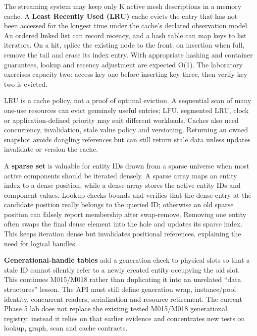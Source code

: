 \hypertarget{05-engine-i-ch008-an-lru-cache-and-a-sparse-set-reconnect-algorithms-to-engine-ownership}{}

The streaming system may keep only K active mesh descriptions in a memory cache. A \textbf{Least Recently Used (LRU)} cache evicts the entry that has not been accessed for the longest time under the cache's declared observation model. An ordered linked list can record recency, and a hash table can map keys to list iterators. On a hit, splice the existing node to the front; on insertion when full, remove the tail and erase its index entry. With appropriate hashing and container guarantees, lookup and recency adjustment are expected O(1). The laboratory exercises capacity two: access key one before inserting key three, then verify key two is evicted.

LRU is a cache policy, not a proof of optimal eviction. A sequential scan of many one-use resources can evict genuinely useful entries; LFU, segmented LRU, clock or application-defined priority may suit different workloads. Caches also need concurrency, invalidation, stale value policy and versioning. Returning an owned snapshot avoids dangling references but can still return stale data unless updates invalidate or version the cache.

A \textbf{sparse set} is valuable for entity IDs drawn from a sparse universe when most active components should be iterated densely. A sparse array maps an entity index to a dense position, while a dense array stores the active entity IDs and component values. Lookup checks bounds and verifies that the dense entry at the candidate position really belongs to the queried ID; otherwise an old sparse position can falsely report membership after swap-remove. Removing one entity often swaps the final dense element into the hole and updates its sparse index. This keeps iteration dense but invalidates positional references, explaining the need for logical handles.

\textbf{Generational-handle tables} add a generation check to physical slots so that a stale ID cannot silently refer to a newly created entity occupying the old slot. This continues M015/M018 rather than duplicating it into an unrelated ``data structures'' lesson. The API must still define generation wrap, instance/pool identity, concurrent readers, serialization and resource retirement. The current Phase 5 lab does not replace the existing tested M015/M018 generational registry; instead it relies on that earlier evidence and concentrates new tests on lookup, graph, scan and cache contracts.

